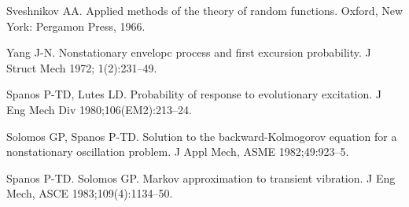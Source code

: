 \documentclass{article}
\begin{document}
\begin{thebibliography}{99}
  {}Sveshnikov AA. Applied methods of the theory of
  random functions. Oxford, New York: Pergamon Press, 1966.
  
  {}Yang J-N. Nonstationary envelopc process and first
  excursion probability. J Struct Mech 1972; 1(2):231--49.
  
  {}Spanos P-TD, Lutes LD. Probability of response to
  evolutionary excitation. J Eng Mech Div 1980;106(EM2):213--24.
  
  {}Solomos GP, Spanos P-TD. Solution to the
  backward-Kolmogorov equation for a nonstationary oscillation problem. J Appl
  Mech, ASME 1982;49:923--5.
  
  {}Spanos P-TD. Solomos GP. Markov approximation
  to transient vibration. J Eng Mech, ASCE 1983;109(4):1134--50.
\end{thebibliography}
\end{document}
